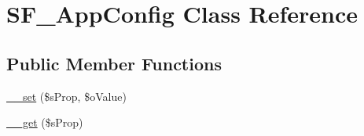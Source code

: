 \hypertarget{classSF__AppConfig}{
\section{SF\_\-AppConfig Class Reference}
\label{classSF__AppConfig}
}
\subsection*{Public Member Functions}
\begin{DoxyCompactItemize}
\item 
\hyperlink{classSF__AppConfig_a9ad3d2905b2a50dfbee6d5f473e758a9}{\_\-\_\-set} (\$sProp, \$oValue)
\item 
\hyperlink{classSF__AppConfig_a9519b5bba407a1a89f324fcc7f26c0e2}{\_\-\_\-get} (\$sProp)
\end{DoxyCompactItemize}
